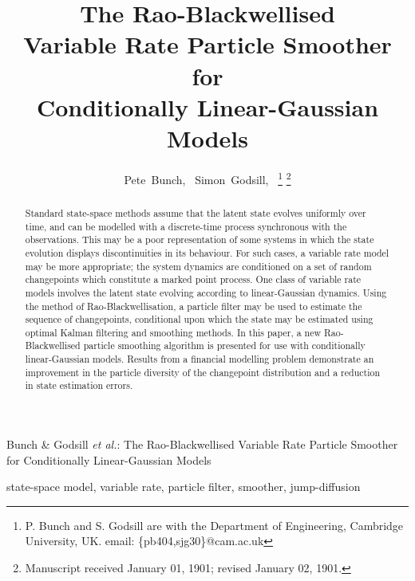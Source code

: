 \documentclass[journal]{IEEEtran}
\begin{document}
\title{The Rao-Blackwellised \\ Variable Rate Particle Smoother for \\ Conditionally Linear-Gaussian Models}

\author{Pete~Bunch,~\IEEEmembership{}
        Simon~Godsill,~%
\thanks{P. Bunch and S. Godsill are with the Department
of Engineering, Cambridge University, UK. email: \{pb404,sjg30\}@cam.ac.uk}%
\thanks{Manuscript received January 01, 1901; revised January 02, 1901.}}

%
{Bunch \& Godsill \MakeLowercase{\textit{et al.}}: The Rao-Blackwellised Variable Rate Particle Smoother for Conditionally Linear-Gaussian Models}

\maketitle

\begin{abstract}
Standard state-space methods assume that the latent state evolves uniformly over time, and can be modelled with a discrete-time process synchronous with the observations. This may be a poor representation of some systems in which the state evolution displays discontinuities in its behaviour. For such cases, a variable rate model may be more appropriate; the system dynamics are conditioned on a set of random changepoints which constitute a marked point process. One class of variable rate models involves the latent state evolving according to linear-Gaussian dynamics. Using the method of Rao-Blackwellisation, a particle filter may be used to estimate the sequence of changepoints, conditional upon which the state may be estimated using optimal Kalman filtering and smoothing methods. In this paper, a new Rao-Blackwellised particle smoothing algorithm is presented for use with conditionally linear-Gaussian models. Results from a financial modelling problem demonstrate an improvement in the particle diversity of the changepoint distribution and a reduction in state estimation errors.
\end{abstract}

\begin{IEEEkeywords}
state-space model, variable rate, particle filter, smoother, jump-diffusion
\end{IEEEkeywords}
\end{document}
